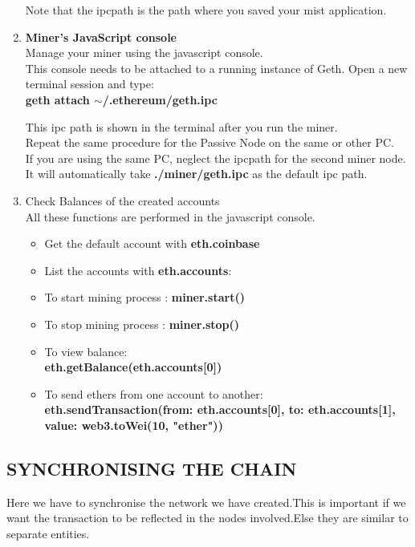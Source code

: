 \documentclass[journal,12pt,twocolumn]{IEEEtran}
\begin{document}
\begin{enumerate}
Note that the ipcpath is the path where you saved your mist application.

\item \textbf{Miner's JavaScript console}\\
Manage your miner using the javascript console.\\
This console needs to be attached to a running instance of Geth.
Open a new terminal session and type:\\
\textbf{geth attach $\sim$/.ethereum/geth.ipc}

This ipc path is shown in the terminal after you run the miner. \\

Repeat the same procedure for the Passive Node on the same or other PC.\\
If you are using the same PC, neglect the ipcpath for the second miner node. It will automatically take \textbf{./miner/geth.ipc} as the default ipc path.

\item Check Balances of the created accounts\\
All these functions are performed in the javascript console.
\begin{itemize}
\item Get the default account with \textbf{eth.coinbase}
\item List the accounts with \textbf{eth.accounts}:
\item To start mining process : \textbf{miner.start()}
\item To stop mining process : \textbf{miner.stop()}
\item To view balance: \\ \textbf{eth.getBalance(eth.accounts[0])}
\item To send ethers from one account to another: \\ \textbf{eth.sendTransaction({from: eth.accounts[0], to: eth.accounts[1], value: web3.toWei(10, "ether")})}
\end{itemize}
\end{enumerate}
\subsection{SYNCHRONISING THE CHAIN}
Here we have to synchronise the network we have created.This is important if we want the transaction to be reflected in the nodes involved.Else they are similar to separate entities.\\
\end{document}
